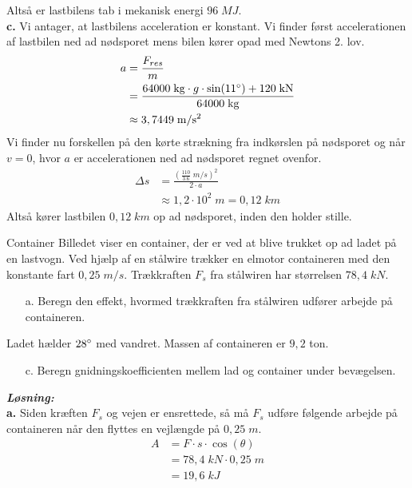 \documentclass{report}
\newcommand{\sol}{\setlength{\parindent}{0cm}\textbf{\textit{Løsning:}}\setlength{\parindent}{1cm}}
\begin{document}
Altså er lastbilens tab i mekanisk energi $96 \;\unit{MJ} $. \\[1ex]
\textbf{c.} Vi antager, at lastbilens acceleration er konstant.
Vi finder først accelerationen af lastbilen ned ad nødsporet mens bilen kører opad med Newtons 2. lov.
\begin{equation*}
\begin{split}
  a&= \frac{F_{res}}{m} \\ 
  &=\frac{64000 \;\unit{kg} \cdot g \cdot \sin(11\degree)+120 \;\unit{kN} }{64000 \;\unit{kg} } \\ 
  &\approx 3,7449 \;\unit{m/s^2} 
\end{split}
\end{equation*}
Vi finder nu forskellen på den kørte strækning fra indkørslen på nødsporet og når $v=0$, hvor $a$ er accelerationen ned ad nødsporet regnet ovenfor. 
\begin{equation*}
\begin{split}
  \Delta s &= \frac{\left(\frac{110}{3.6}\;\unit{m/s}\right)^2  }{2\cdot a} \\ 
  &\approx 1,2 \cdot 10^2 \;\unit{m} = 0,12 \;\unit{km}  
\end{split}
\end{equation*}
Altså kører lastbilen $0,12 \;\unit{km} $ op ad nødsporet, inden den holder stille. 
\begin{question}{Container}{}
  Billedet viser en container, der er ved at blive trukket op ad ladet på en lastvogn. Ved hjælp af en stålwire trækker en elmotor containeren med den konstante fart $0,25 \;\unit{m/s} $.
  Trækkraften $F_s$ fra stålwiren har størrelsen $78,4 \;\unit{kN} $.  
  \begin{itemize}
    \item[a.] Beregn den effekt, hvormed trækkraften fra stålwiren udfører arbejde på containeren.
  \end{itemize}
Ladet hælder $28\degree$ med vandret. Massen af containeren er $9,2$ ton. 
\begin{itemize}
  \item[c.] Beregn gnidningskoefficienten mellem lad og container under bevægelsen.
\end{itemize}
\end{question}
\sol \\ 
\textbf{a.} Siden kræften $F_s$ og vejen er ensrettede, så må $F_s$ udføre følgende arbejde på containeren når den flyttes en vejlængde på $0,25 \;\unit{m} $. 
\begin{equation*}
\begin{split}
  A&=F\cdot s \cdot \cos(\theta) \\ 
  &=78,4 \;\unit{kN} \cdot 0,25 \;\unit{m} \\ 
  &= 19,6 \;\unit{kJ} 
\end{split}
\end{equation*}
\end{document}

